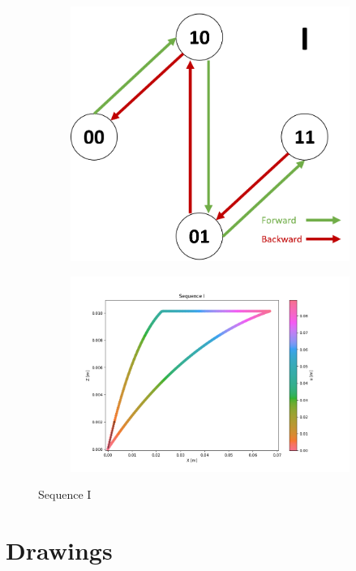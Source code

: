         \begin{figure}[h]
            \begin{subfigure}{.3\textwidth}
            \includegraphics[width=\textwidth]{images/S_I.png}
            \end{subfigure}%
            \begin{subfigure}{.7\textwidth}
            \includegraphics[width=\textwidth]{images/I.png}
            \end{subfigure}
            \caption{Sequence I}
        \end{figure}        
        
    \section{Drawings}
        
        